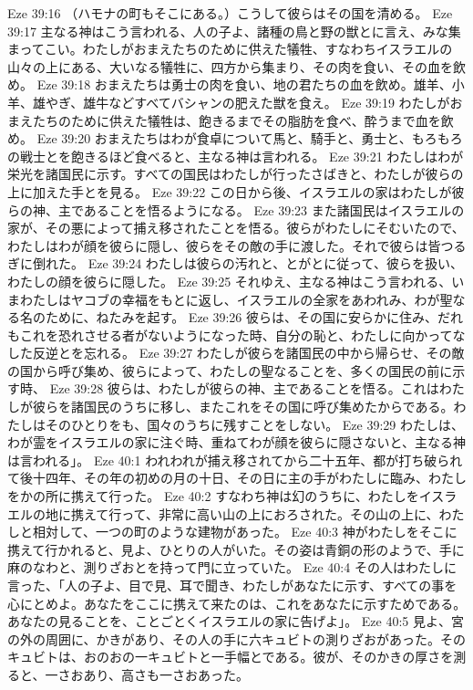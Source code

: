 Eze 39:16  （ハモナの町もそこにある。）こうして彼らはその国を清める。
Eze 39:17  主なる神はこう言われる、人の子よ、諸種の鳥と野の獣とに言え、みな集まってこい。わたしがおまえたちのために供えた犠牲、すなわちイスラエルの山々の上にある、大いなる犠牲に、四方から集まり、その肉を食い、その血を飲め。
Eze 39:18  おまえたちは勇士の肉を食い、地の君たちの血を飲め。雄羊、小羊、雄やぎ、雄牛などすべてバシャンの肥えた獣を食え。
Eze 39:19  わたしがおまえたちのために供えた犠牲は、飽きるまでその脂肪を食べ、酔うまで血を飲め。
Eze 39:20  おまえたちはわが食卓について馬と、騎手と、勇士と、もろもろの戦士とを飽きるほど食べると、主なる神は言われる。
Eze 39:21  わたしはわが栄光を諸国民に示す。すべての国民はわたしが行ったさばきと、わたしが彼らの上に加えた手とを見る。
Eze 39:22  この日から後、イスラエルの家はわたしが彼らの神、主であることを悟るようになる。
Eze 39:23  また諸国民はイスラエルの家が、その悪によって捕え移されたことを悟る。彼らがわたしにそむいたので、わたしはわが顔を彼らに隠し、彼らをその敵の手に渡した。それで彼らは皆つるぎに倒れた。
Eze 39:24  わたしは彼らの汚れと、とがとに従って、彼らを扱い、わたしの顔を彼らに隠した。
Eze 39:25  それゆえ、主なる神はこう言われる、いまわたしはヤコブの幸福をもとに返し、イスラエルの全家をあわれみ、わが聖なる名のために、ねたみを起す。
Eze 39:26  彼らは、その国に安らかに住み、だれもこれを恐れさせる者がないようになった時、自分の恥と、わたしに向かってなした反逆とを忘れる。
Eze 39:27  わたしが彼らを諸国民の中から帰らせ、その敵の国から呼び集め、彼らによって、わたしの聖なることを、多くの国民の前に示す時、
Eze 39:28  彼らは、わたしが彼らの神、主であることを悟る。これはわたしが彼らを諸国民のうちに移し、またこれをその国に呼び集めたからである。わたしはそのひとりをも、国々のうちに残すことをしない。
Eze 39:29  わたしは、わが霊をイスラエルの家に注ぐ時、重ねてわが顔を彼らに隠さないと、主なる神は言われる」。
Eze 40:1  われわれが捕え移されてから二十五年、都が打ち破られて後十四年、その年の初めの月の十日、その日に主の手がわたしに臨み、わたしをかの所に携えて行った。
Eze 40:2  すなわち神は幻のうちに、わたしをイスラエルの地に携えて行って、非常に高い山の上におろされた。その山の上に、わたしと相対して、一つの町のような建物があった。
Eze 40:3  神がわたしをそこに携えて行かれると、見よ、ひとりの人がいた。その姿は青銅の形のようで、手に麻のなわと、測りざおとを持って門に立っていた。
Eze 40:4  その人はわたしに言った、「人の子よ、目で見、耳で聞き、わたしがあなたに示す、すべての事を心にとめよ。あなたをここに携えて来たのは、これをあなたに示すためである。あなたの見ることを、ことごとくイスラエルの家に告げよ」。
Eze 40:5  見よ、宮の外の周囲に、かきがあり、その人の手に六キュビトの測りざおがあった。そのキュビトは、おのおの一キュビトと一手幅とである。彼が、そのかきの厚さを測ると、一さおあり、高さも一さおあった。

